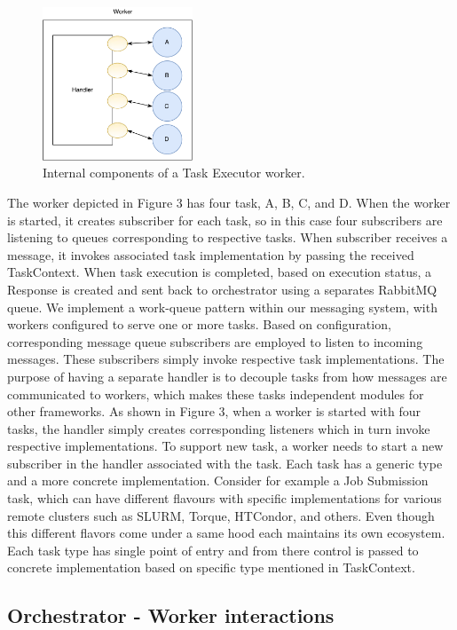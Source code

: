 \documentclass[review]{elsarticle}
\begin{document}
\begin{figure}
\centering
\includegraphics[height=1.8in, width=1.8 in]{figures/figure3.pdf}
\caption{Internal components of a Task Executor worker.}
\end{figure}

The worker depicted in Figure 3 has four task, A, B, C, and D. When the worker is started, it creates subscriber for each task, so in this case four subscribers are listening to queues corresponding to respective tasks. When subscriber receives a message, it invokes associated task implementation by passing the received TaskContext. When task execution is completed, based on execution status, a Response is created and sent back to orchestrator using a separates RabbitMQ queue.    
We implement a work-queue pattern within our messaging system, with workers configured to serve one or more tasks. Based on configuration, corresponding message queue subscribers are employed to listen to incoming messages. These subscribers simply invoke respective task implementations. The purpose of having a separate handler is to decouple tasks from how messages are communicated to workers, which makes these tasks independent modules for other frameworks. As shown in Figure 3, when a worker is started with four tasks, the handler simply creates corresponding listeners which in turn invoke respective implementations. To support new task, a worker needs to start a new subscriber in the handler associated with the task. 
Each task has a generic type and a more concrete implementation. Consider for example a Job Submission task, which can have different flavours with specific implementations for various remote clusters such as SLURM, Torque, HTCondor, and others. Even though this different flavors come under a same hood each maintains its own ecosystem. Each task type has single point of entry and from there control is passed to concrete implementation based on specific type mentioned in TaskContext. 

\subsection{Orchestrator - Worker interactions}
\end{document}
